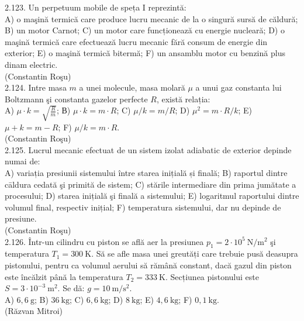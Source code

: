 2.123. Un perpetuum mobile de speța I reprezintă:\\ A) o maşină termică care produce lucru mecanic de la o singură sursă de căldură; B) un motor Carnot; C) un motor care funcționează cu energie nucleară; D) o maşină termică care efectuează lucru mecanic fără consum de energie din exterior; E) o maşină termică bitermă; F) un ansamblu motor cu benzină plus dinam electric.\\ (Constantin Roşu)\\

2.124. Intre masa $m$ a unei molecule, masa molară $\mu$ a unui gaz constanta lui Boltzmann şi constanta gazelor perfecte $R$, există relația:\\ A) $\mu \cdot k=\sqrt{\frac{R}{m}}$; В) $\mu \cdot k=m \cdot R$; C) $\mu / k=m / R$; D) $\mu^{2}=m \cdot R / k$; E) $\mu+k=m-R$; F) $\mu / k=m \cdot R$.\\ (Constantin Roşu)\\

2.125. Lucrul mecanic efectuat de un sistem izolat adiabatic de exterior depinde numai de:\\ A) variația presiunii sistemului între starea inițială și finală; B) raportul dintre cāldura cedată şi primită de sistem; C) stările intermediare din prima jumătate a procesului; D) starea inițială şi finală a sistemului; E) logaritmul raportului dintre volumul final, respectiv inițial; F) temperatura sistemului, dar nu depinde de presiune.\\ (Constantin Roşu)\\

2.126. Într-un cilindru cu piston se află aer la presiunea $p_{1}=2 \cdot 10^{5} \mathrm{~N} / \mathrm{m}^{2}$ şi temperatura $T_{1}=300 \mathrm{~K}$. Să se afle masa unei greutăți care trebuie pusă deasupra pistonului, pentru ca volumul aerului să rămână constant, dacă gazul din piston este încălzit până la temperatura $T_{2}=333 \mathrm{~K}$. Secțiunea pistonului este $S=3 \cdot 10^{-3} \mathrm{~m}^{2}$. Se dă: $g=10 \mathrm{~m} / \mathrm{s}^{2}$.\\ A) $6,6 \mathrm{~g}$; B) $36 \mathrm{~kg}$; C) $6,6 \mathrm{~kg}$; D) $8 \mathrm{~kg}$; E) $4,6 \mathrm{~kg}$; F) $0,1 \mathrm{~kg}$.\\ (Răzvan Mitroi)\\

